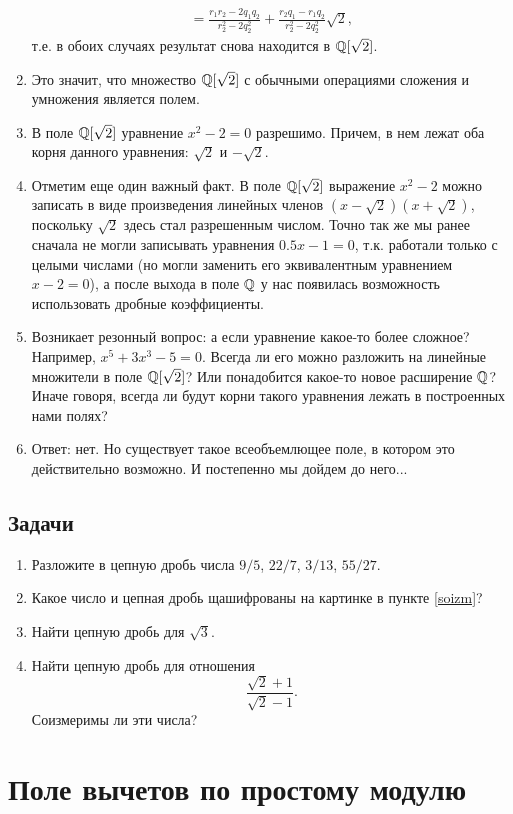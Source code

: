 \begin{enumerate}
\begin{multline*}
=\frac{r_1r_2-2q_1q_2}{r_2^2-2q_2^2}+\frac{r_2q_1-r_1q_2}{r_2^2-2q_2^2}\sqrt 2,
\end{multline*}
т.е. в обоих случаях результат снова находится в $\mathbb Q[\sqrt 2]$.
\item Это значит, что множество $\mathbb Q[\sqrt 2]$ с обычными операциями сложения и умножения является полем.
\item В поле $\mathbb Q[\sqrt 2]$ уравнение $x^2-2=0$ разрешимо. Причем, в нем лежат оба корня данного уравнения: $\sqrt 2$ и $-\sqrt 2$.
\item Отметим еще один важный факт. В поле $\mathbb Q[\sqrt 2]$ выражение $x^2-2$ можно записать в виде произведения линейных членов $(x-\sqrt 2)(x+\sqrt 2)$, поскольку $\sqrt 2$ здесь стал разрешенным числом. Точно так же мы ранее сначала не могли записывать уравнения $0.5x-1=0$, т.к. работали только с целыми числами (но могли заменить его эквивалентным уравнением $x-2=0$), а после выхода в поле $\mathbb Q$ у нас появилась возможность использовать дробные коэффициенты.
\item Возникает резонный вопрос: а если уравнение какое-то более сложное? Например, $x^5+3x^3-5=0$. Всегда ли его можно разложить на линейные множители в поле $\mathbb Q[\sqrt 2]$? Или понадобится какое-то новое расширение $\mathbb Q$?
Иначе говоря, всегда ли будут корни такого уравнения лежать в построенных нами полях?
\item Ответ: нет. Но существует такое всеобъемлющее поле, в котором это действительно возможно. И постепенно мы дойдем до него...
\end{enumerate}


\subsection*{Задачи}

\begin{enumerate}
\item Разложите в цепную дробь числа $9/5$, $22/7$, $3/13$, $55/27$.
\item Какое число и цепная дробь щашифрованы на картинке в пункте \ref{soizm}?
\item Найти цепную дробь для $\sqrt 3$.
\item Найти цепную дробь для отношения 
$$
\frac{\sqrt 2+1}{\sqrt 2-1}.
$$
Соизмеримы ли эти числа?
\end{enumerate}



\section{Поле вычетов по простому модулю}

